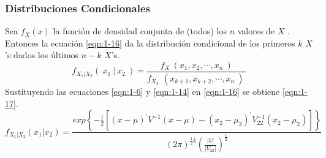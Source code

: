 \subsubsection{Distribuciones Condicionales}
Sea $f_X(x)$ la función de densidad conjunta de (todos) los $n$   valores de $X$  . Entonces la ecuación  \ref{eqn:1-16} da la distribución condicional de los primeros $k$ $X$'s dados los últimos $n-k$ $X$'s.
\begin{equation}
    f_{X_1|X_2} (\ x_1\ |\ x_2\ )=\frac{f_X\ (x_1,x_2,\cdots,x_n\ )}{f_{X_2\ }\ (x_{k+1},x_{k+2},\cdots,x_n\ )\ }
    \label{eqn:1-16}
\end{equation}
Sustituyendo las ecuaciones  \ref{eqn:1-6} y \ref{eqn:1-14} en \ref{eqn:1-16} se obtiene \ref{eqn:1-17}.
\begin{equation}
    f_{X_1\left|X_2\right.}\left(\left.x_1\right|x_2\right)=\frac{exp{\left\{-\frac{1}{2}\left[\left(x-\mu\right)^\prime V^{-1}\left(x-\mu\right)-\left(x_2-\mu_2\right)^\prime V_{22}^{-1}\left(x_2-\mu_2\right)\right]\right\}}}{\left(2\pi\right)^{\frac{1}{2}k}\left(\frac{\left|V\right|}{\left|V_{22}\right|}\right)^\frac{1}{2}}
    \label{eqn:1-17}
\end{equation}
